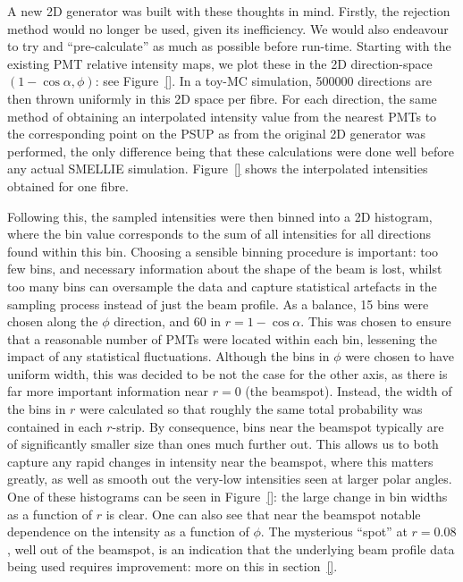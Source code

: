 A new 2D generator was built with these thoughts in mind. Firstly, the rejection method would no longer be used, given its inefficiency. We would also endeavour to try and ``pre-calculate'' as much as possible before run-time. Starting with the existing PMT relative intensity maps, we plot these in the 2D direction-space $(1-\cos\alpha, \phi)$: see Figure~\ref{}. In a toy-MC simulation, \num{500000} directions are then thrown uniformly in this 2D space per fibre. For each direction, the same method of obtaining an interpolated intensity value from the nearest PMTs to the corresponding point on the PSUP as from the original 2D generator was performed, the only difference being that these calculations were done well before any actual SMELLIE simulation. Figure~\ref{} shows the interpolated intensities obtained for one fibre.

Following this, the sampled intensities were then binned into a 2D histogram, where the bin value corresponds to the sum of all intensities for all directions found within this bin. Choosing a sensible binning procedure is important: too few bins, and necessary information about the shape of the beam is lost, whilst too many bins can oversample the data and capture statistical artefacts in the sampling process instead of just the beam profile. As a balance, 15 bins were chosen along the $\phi$ direction, and 60 in $r=1-\cos\alpha$. This was chosen to ensure that a reasonable number of PMTs were located within each bin, lessening the impact of any statistical fluctuations. Although the bins in $\phi$ were chosen to have uniform width, this was decided to be not the case for the other axis, as there is far more important information near $r = 0$ (the beamspot). Instead, the width of the bins in $r$ were calculated so that roughly the same total probability was contained in each $r$-strip. By consequence, bins near the beamspot typically are of significantly smaller size than ones much further out. This allows us to both capture any rapid changes in intensity near the beamspot, where this matters greatly, as well as smooth out the very-low intensities seen at larger polar angles. One of these histograms can be seen in Figure~\ref{}: the large change in bin widths as a function of $r$ is clear. One can also see that near the beamspot notable dependence on the intensity as a function of $\phi$. The mysterious ``spot'' at $r = 0.08$, well out of the beamspot, is an indication that the underlying beam profile data being used requires improvement: more on this in section~\ref{}.

